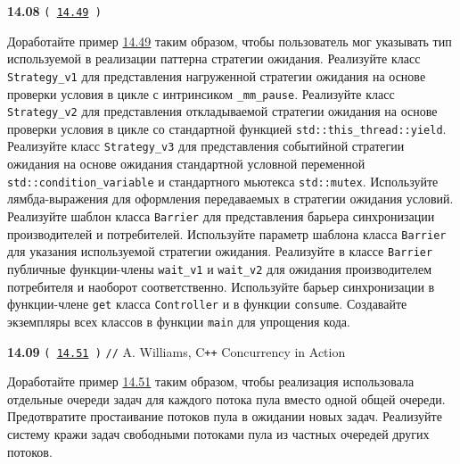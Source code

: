 \documentclass[a4paper,12pt]{article}
\begin{document}
\bigskip

{\large \textbf{14.08} \texttt{(\,\href{https://github.com/i-s-m-mipt/Education/blob/master/projects/examples/source/14.49.cpp}{14.49}\,)}}

\bigskip

Доработайте пример \href{https://github.com/i-s-m-mipt/Education/blob/master/projects/examples/source/14.49.cpp}{14.49} таким образом, чтобы пользователь мог указывать тип используемой в реализации паттерна стратегии ожидания. Реализуйте класс \lstinline{Strategy_v1} для представления нагруженной стратегии ожидания на основе проверки условия в цикле с интринсиком \lstinline{_mm_pause}. Реализуйте класс \lstinline{Strategy_v2} для представления откладываемой стратегии ожидания на основе проверки условия в цикле со стандартной функцией \lstinline{std::this_thread::yield}. Реализуйте класс \lstinline{Strategy_v3} для представления событийной стратегии ожидания на основе ожидания стандартной условной переменной \lstinline{std::condition_variable} и стандартного мьютекса \lstinline{std::mutex}. Используйте лямбда-выражения для оформления передаваемых в стратегии ожидания условий. Реализуйте шаблон класса \lstinline{Barrier} для представления барьера синхронизации производителей и потребителей. Используйте параметр шаблона класса \lstinline{Barrier} для указания используемой стратегии ожидания. Реализуйте в классе \lstinline{Barrier} публичные функции-члены \lstinline{wait_v1} и \lstinline{wait_v2} для ожидания производителем потребителя и наоборот соответственно. Используйте барьер синхронизации в функции-члене \lstinline{get} класса \lstinline{Controller} и в функции \lstinline{consume}. Создавайте экземпляры всех классов в функции \lstinline{main} для упрощения кода.

\bigskip

{\large \textbf{14.09} \texttt{(\,\href{https://github.com/i-s-m-mipt/Education/blob/master/projects/examples/source/14.51.cpp}{14.51}\,)} \texttt{//} A. Williams, C\texttt{++} Concurrency in Action}

\bigskip

Доработайте пример \href{https://github.com/i-s-m-mipt/Education/blob/master/projects/examples/source/14.51.cpp}{14.51} таким образом, чтобы реализация использовала отдельные очереди задач для каждого потока пула вместо одной общей очереди. Предотвратите простаивание потоков пула в ожидании новых задач. Реализуйте систему кражи задач свободными потоками пула из частных очередей других потоков.

\bigskip
\end{document}
